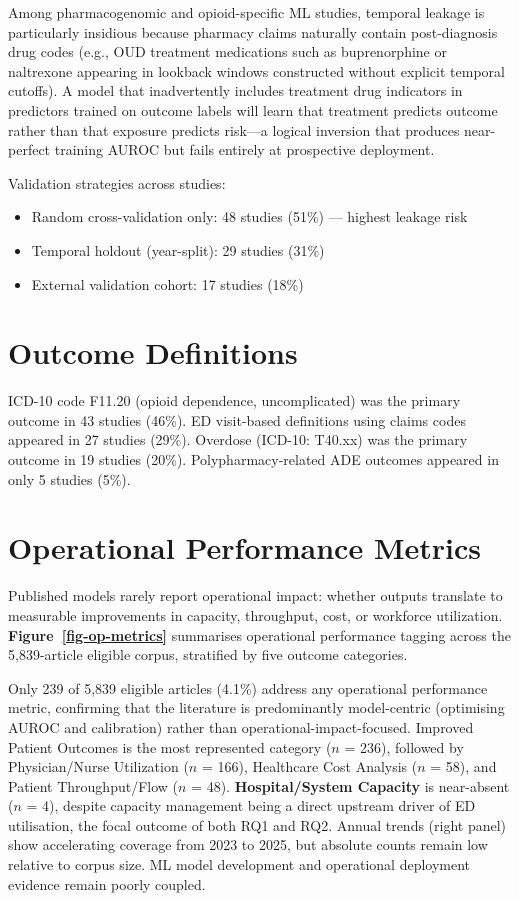 \documentclass[
  12pt,
]{book}
\providecommand{\tightlist}{%
  \setlength{\itemsep}{0pt}\setlength{\parskip}{0pt}}
\begin{document}
Among pharmacogenomic and opioid-specific ML studies, temporal leakage
is particularly insidious because pharmacy claims naturally contain
post-diagnosis drug codes (e.g., OUD treatment medications such as
buprenorphine or naltrexone appearing in lookback windows constructed
without explicit temporal cutoffs). A model that inadvertently includes
treatment drug indicators in predictors trained on outcome labels will
learn that treatment predicts outcome rather than that exposure predicts
risk---a logical inversion that produces near-perfect training AUROC but
fails entirely at prospective deployment.

Validation strategies across studies:

\begin{itemize}
\tightlist
\item
  Random cross-validation only: 48 studies (51\%) --- highest leakage
  risk
\item
  Temporal holdout (year-split): 29 studies (31\%)
\item
  External validation cohort: 17 studies (18\%)
\end{itemize}

\section{Outcome Definitions}\label{outcome-definitions}

ICD-10 code F11.20 (opioid dependence, uncomplicated) was the primary
outcome in 43 studies (46\%). ED visit-based definitions using claims
codes appeared in 27 studies (29\%). Overdose (ICD-10: T40.xx) was the
primary outcome in 19 studies (20\%). Polypharmacy-related ADE outcomes
appeared in only 5 studies (5\%).

\section{Operational Performance
Metrics}\label{operational-performance-metrics}

Published models rarely report operational impact: whether outputs
translate to measurable improvements in capacity, throughput, cost, or
workforce utilization. \textbf{Figure~\ref{fig-op-metrics}} summarises
operational performance tagging across the 5,839-article eligible
corpus, stratified by five outcome categories.

Only 239 of 5,839 eligible articles (4.1\%) address any operational
performance metric, confirming that the literature is predominantly
model-centric (optimising AUROC and calibration) rather than
operational-impact-focused. Improved Patient Outcomes is the most
represented category (\(n\) = 236), followed by Physician/Nurse
Utilization (\(n\) = 166), Healthcare Cost Analysis (\(n\) = 58), and
Patient Throughput/Flow (\(n\) = 48). \textbf{Hospital/System Capacity}
is near-absent (\(n\) = 4), despite capacity management being a direct
upstream driver of ED utilisation, the focal outcome of both RQ1 and
RQ2. Annual trends (right panel) show accelerating coverage from 2023 to
2025, but absolute counts remain low relative to corpus size. ML model
development and operational deployment evidence remain poorly coupled.
\end{document}
